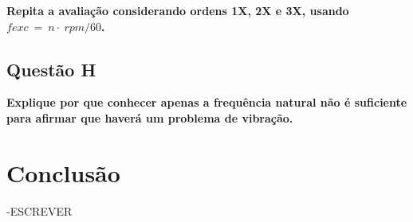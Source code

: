 \documentclass[a4paper, 12pt]{article}
\begin{document}
\textbf{Repita a avaliação considerando ordens 1X, 2X e 3X, usando $fexc~=~n\cdot~rpm/60$.} 

\subsection{Questão H}

\textbf{Explique por que conhecer apenas a frequência natural não é suficiente para afirmar que haverá um 
problema de vibração.}

\section{Conclusão}

-ESCREVER

\printbibliography[heading=bibintoc,title={Referências}]
\end{document}
